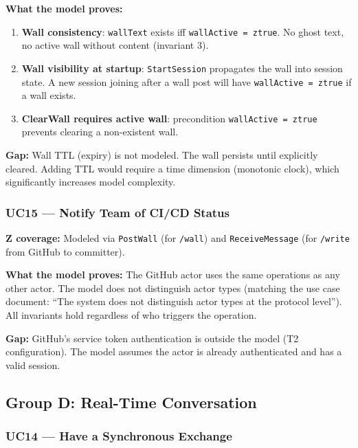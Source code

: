 \documentclass[a4paper,10pt,fleqn]{article}
\begin{document}
\textbf{What the model proves:}

\begin{enumerate}
  \item \textbf{Wall consistency}: \texttt{wallText} exists iff
    \texttt{wallActive = ztrue}. No ghost text, no active wall without
    content (invariant 3).
  \item \textbf{Wall visibility at startup}: \texttt{StartSession}
    propagates the wall into session state. A new session joining after
    a wall post will have \texttt{wallActive = ztrue} if a wall exists.
  \item \textbf{ClearWall requires active wall}: precondition
    \texttt{wallActive = ztrue} prevents clearing a non-existent wall.
\end{enumerate}

\textbf{Gap:} Wall TTL (expiry) is not modeled. The wall persists until
explicitly cleared. Adding TTL would require a time dimension
(monotonic clock), which significantly increases model complexity.

\subsubsection{UC15 --- Notify Team of CI/CD Status}

\textbf{Z coverage:} Modeled via \texttt{PostWall} (for \texttt{/wall})
and \texttt{ReceiveMessage} (for \texttt{/write} from GitHub to
committer).

\textbf{What the model proves:} The GitHub actor uses the same
operations as any other actor. The model does not distinguish actor
types (matching the use case document: ``The system does not distinguish
actor types at the protocol level''). All invariants hold regardless of
who triggers the operation.

\textbf{Gap:} GitHub's service token authentication is outside the
model (T2 configuration). The model assumes the actor is already
authenticated and has a valid session.

\subsection{Group D: Real-Time Conversation}

\subsubsection{UC14 --- Have a Synchronous Exchange}
\end{document}
